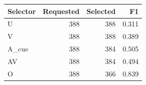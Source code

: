 \begin{tabular}{lrrr}
\toprule Selector & Requested & Selected & F1 \\
\midrule
U & 388 & 388 & 0.311 \\
V & 388 & 388 & 0.389 \\
A\_cue & 388 & 384 & 0.505 \\
AV & 388 & 384 & 0.494 \\
O & 388 & 366 & 0.839 \\
\bottomrule
\end{tabular}
